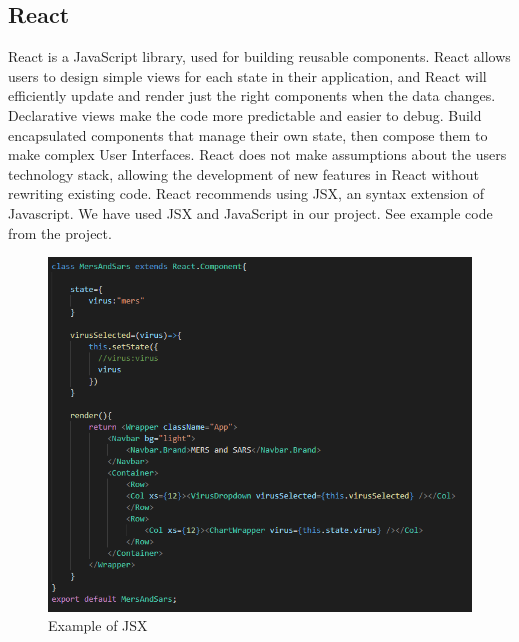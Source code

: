 \subsection{React}
React is a JavaScript library, used for building reusable components. React allows users to design simple views for each state in their application, and React will efficiently update and render just the right components when the data changes.
Declarative views make the code more predictable and easier to debug. Build encapsulated components that manage their own state, then compose them to make complex User Interfaces. React does not make assumptions about the users technology stack, allowing the development of new features in React without rewriting existing code.\cite{react}
React recommends using JSX, an syntax extension of Javascript. We have used JSX and JavaScript in our project.
See example code from the project.
\begin{figure}[H]
    \centering
    \includegraphics[scale=0.4]{img/jsx.PNG}
    \caption{Example of JSX}
    \label{fig:my_label4}
\end{figure}


